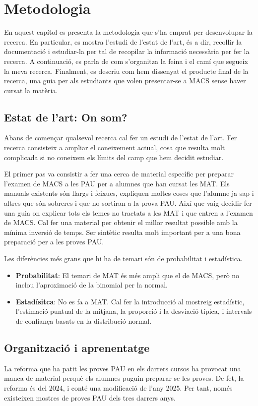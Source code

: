\chapter{Metodologia}
\label{c:metodologia}
En aquest capítol es presenta la metodologia que s'ha emprat per desenvolupar la recerca. En particular, es mostra l'estudi de l'estat de l'art, és a dir, recollir la documentació i estudiar-la per tal de recopilar la informació necessària per fer la recerca. A continuació, es parla de com s'organitza la feina i el camí que segueix la meva recerca. Finalment, es descriu com hem dissenyat el producte final de la recerca, una guia per als estudiants que volen presentar-se a MACS sense haver cursat la matèria.

\section{Estat de l'art: On som?}
Abans de començar qualsevol recerca cal fer un estudi de l'estat de l'art. Fer recerca consisteix a ampliar el coneixement actual, cosa que resulta molt complicada si no coneixem els límits del camp que hem decidit estudiar.

El primer pas va consistir a fer una cerca de material específic per preparar l'examen de MACS a les PAU per a alumnes que han cursat les MAT. Els manuals existents són llargs i feixucs, expliquen moltes coses que l'alumne ja sap i altres que són sobreres i que no sortiran a la prova PAU. Així que vaig decidir fer una guia on explicar tots els temes no tractats a les MAT i que entren a l'examen de MACS. Cal fer una material per obtenir el millor resultat possible amb la mínima inversió de temps. Ser sintètic resulta molt important per a una bona preparació per a les proves PAU.

Les diferències més grans que hi ha de temari són de probabilitat i estadística.
\begin{itemize}
 \item \textbf{Probabilitat}: El temari de MAT és més ampli que el de MACS, però no inclou l'aproximació de la binomial per la normal.
 \item \textbf{Estadísitca}: No es fa a MAT. Cal fer la introducció al mostreig estadístic, l'estimació puntual de la mitjana, la proporció i la desviació típica, i intervals de confiança basats en la distribució normal.
\end{itemize}


\section{Organització i aprenentatge}
La reforma que ha patit les proves PAU en els darrers cursos ha provocat una manca de material perquè els alumnes puguin preparar-se les proves. De fet, la reforma és del 2024, i conté una modificació de l'any 2025. Per tant, només existeixen mostres de proves PAU dels tres darrers anys.

